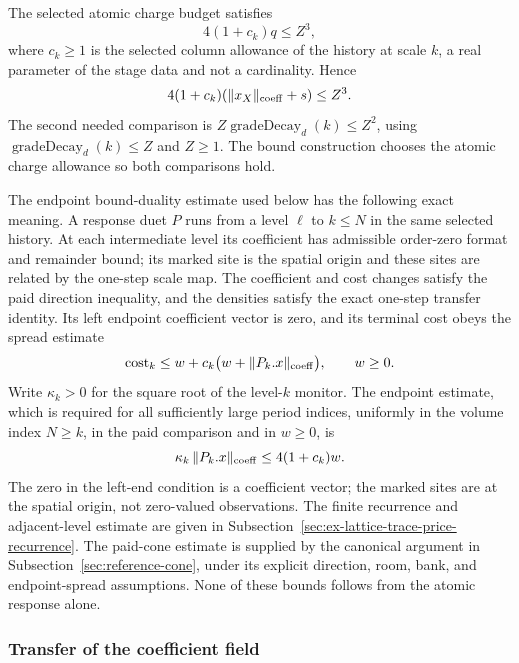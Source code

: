 The selected atomic charge budget satisfies
\begin{equation}
 4(1+c_k)q\leq Z^3,
 \label{eq:ex-trace-coffer-budget}
\end{equation}
where \(c_k\geq1\) is the selected column allowance of the history at
scale \(k\), a real parameter of the stage data and not a cardinality.
Hence
\[
 4(1+c_k)(\|x_X\|_{\rm coeff}+s)\leq Z^3.
\]
The second needed comparison is \(Z\operatorname{gradeDecay}_d(k)\leq Z^2\),
using \(\operatorname{gradeDecay}_d(k)\leq Z\) and \(Z\geq1\). The bound construction
chooses the atomic charge allowance so both comparisons hold.

The endpoint bound-duality estimate used below has the following exact
meaning. A response duet \(P\) runs from a level \(\ell\) to \(k\leq N\)
in the same selected history. At each intermediate level its coefficient
has admissible order-zero format and remainder bound; its marked site is the
spatial origin and these sites are related by the one-step scale map. The
coefficient and cost changes satisfy the paid direction inequality, and
the densities satisfy the exact one-step transfer identity. Its left
endpoint coefficient vector is zero, and its terminal cost obeys the
spread estimate
\[
 \operatorname{cost}_k\leq
 w+c_k\bigl(w+\|P_k.x\|_{\rm coeff}\bigr),\qquad w\geq0.
\]
Write \(\kappa_k>0\) for the square root of the level-\(k\) monitor.
The endpoint estimate, which is required for all sufficiently large
period indices, uniformly in the volume index
\(N\geq k\), in the paid comparison and in \(w\geq0\), is
\begin{equation}
 \kappa_k\,\|P_k.x\|_{\rm coeff}
 \leq4(1+c_k)w.
 \label{eq:ex-trace-sharp-read}
\end{equation}
The zero in the left-end condition is a coefficient vector; the marked sites
are at the spatial origin, not zero-valued observations. The finite recurrence
and adjacent-level estimate are given in
Subsection~\ref{sec:ex-lattice-trace-price-recurrence}. The paid-cone estimate is supplied by the canonical argument in
Subsection~\ref{sec:reference-cone}, under its explicit direction, room, bank,
and endpoint-spread assumptions. None of these bounds follows from the atomic
response alone.

\subsubsection{Transfer of the coefficient field}

